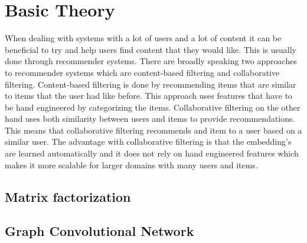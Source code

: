 \section{Basic Theory}
When dealing with systems with a lot of users and a lot of content it can be beneficial to try and help users find content that they would like.
This is usually done through recommender systems.
There are broadly speaking two approaches to recommender systems which are content-based filtering and collaborative filtering.
Content-based filtering is done by recommending items that are similar to items that the user had like before.
This approach uses features that have to be hand engineered by categorizing the items.
Collaborative filtering on the other hand uses both similarity between users and items to provide recommendations. 
This means that collaborative filtering recommends and item to a user based on a similar user.
The advantage with collaborative filtering is that the embedding's are learned automatically and it does not rely on hand engineered features which makes it more scalable for larger domains with many users and items. 

\subsection{Matrix factorization}


\subsection{Graph Convolutional Network}
